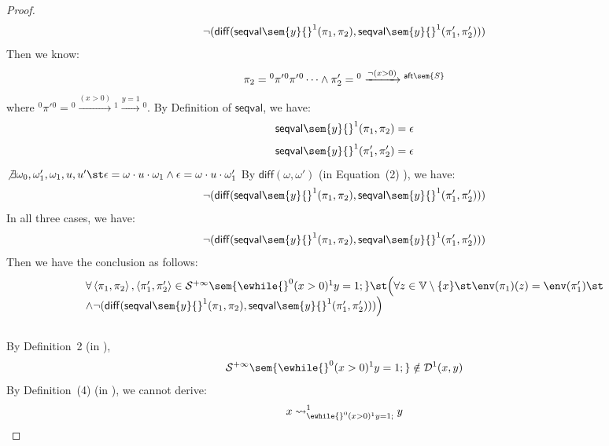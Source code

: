 \begin{example}
\begin{proof}
 \[
  \neg(\mathsf{diff}(\mathsf{seqval}\sem{y}{}^1(\pi_1, \pi_2 ), \mathsf{seqval}\sem{y}{}^1(\pi_1', \pi_2' )))
 \]
 Then we know:
 \[
 \pi_2 = {}^0 \pi' {}^0 \pi' {}^0\cdots 
 \land 
 \pi_2' = {}^0 \xrightarrow{\neg(x > 0)} {}^{\mathsf{aft}\sem{S}}
 \]
 where ${}^0 \pi' {}^0 = {}^0 \xrightarrow{(x > 0)} {}^1 \xrightarrow{y = 1} {}^0$.
 By Definition of $\mathsf{seqval}$, we have:
 \[
  \mathsf{seqval}\sem{y}{}^1(\pi_1, \pi_2 ) = \epsilon
 \]
 \[
  \mathsf{seqval}\sem{y}{}^1(\pi_1', \pi_2' ) = \epsilon
 \]
  $\not \exists \omega_0, \omega_1', \omega_1, u, u' \st 
  \epsilon = \omega \cdot u \cdot \omega_1 
  \land 
  \epsilon = \omega \cdot u \cdot \omega_1'$
 By $\mathsf{diff}(\omega, \omega')$ (in \cite{cousot2019abstract} Equation~(2) ), we have:
 \[
  \neg(\mathsf{diff}(\mathsf{seqval}\sem{y}{}^1(\pi_1, \pi_2 ), \mathsf{seqval}\sem{y}{}^1(\pi_1', \pi_2' )))
 \]
 In all three cases, we have:
 \[
   \neg(\mathsf{diff}(\mathsf{seqval}\sem{y}{}^1(\pi_1, \pi_2 ), \mathsf{seqval}\sem{y}{}^1(\pi_1', \pi_2' )))
 \]
 Then we have the conclusion as follows:
 \[
 \begin{array}{l}
 	\forall \left< \pi_1, \pi_2 \right>,  \left< \pi_1', \pi'_2 \right> \in \mathcal{S}^{+\infty} \sem{\ewhile {}^0 (x > 0) {}^1 y = 1;} \st
 	\Big(
 	\forall z \in \mathbb{V}\setminus \{x\} \st \env(\pi_1)(z) = \env(\pi_1') \st \\
 	\land \neg(\mathsf{diff}(\mathsf{seqval}\sem{y}{}^1(\pi_1, \pi_2), \mathsf{seqval}\sem{y}{}^1(\pi_1', \pi_2' )))\Big)
 \end{array}
 \] 
 \\
 By Definition~2 (in \cite{cousot2019abstract}), 
 \[
 	\mathcal{S}^{+\infty}\sem{\ewhile {}^0 (x > 0) {}^1 y = 1;} 
 \notin \mathcal{D}^1(x, y)
 \]
 By Definition~(4) (in \cite{cousot2019abstract}), we cannot derive:
 \[
 	x \rightsquigarrow^{1}_{\ewhile {}^0 (x > 0) {}^1 y = 1;} y
 \]
 \end{proof}
 \end{example}
 \clearpage
